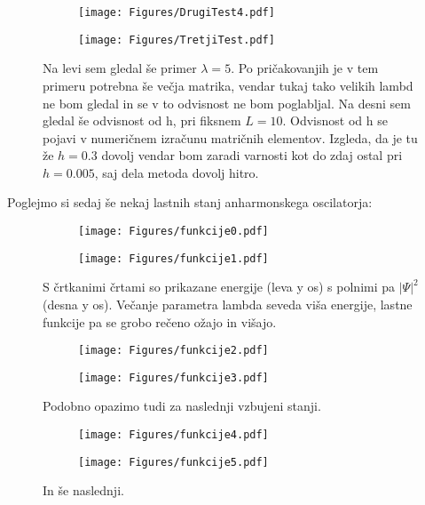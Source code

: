 \documentclass{article}
\begin{document}
\begin{figure}[H]
\centering
\begin{subfigure}{.49\textwidth}
\texttt{[image: Figures/DrugiTest4.pdf]}
\end{subfigure}
\begin{subfigure}{.49\textwidth}
\texttt{[image: Figures/TretjiTest.pdf]}
\end{subfigure}
\caption*{Na levi sem gledal še primer $\lambda = 5$. Po pričakovanjih je v tem primeru potrebna še večja matrika, vendar tukaj tako velikih lambd ne bom gledal in se v to odvisnost ne bom poglabljal. Na desni sem gledal še odvisnost od h, pri fiksnem $L=10$. Odvisnost od h se pojavi v numeričnem izračunu matričnih elementov. Izgleda, da je tu že $h=0.3$ dovolj vendar bom zaradi varnosti kot do zdaj ostal pri $h=0.005$, saj dela metoda dovolj hitro.}
\end{figure}

Poglejmo si sedaj še nekaj lastnih stanj anharmonskega oscilatorja:
\begin{figure}[H]
\centering
\begin{subfigure}{.49\textwidth}
\texttt{[image: Figures/funkcije0.pdf]}
\end{subfigure}
\begin{subfigure}{.49\textwidth}
\texttt{[image: Figures/funkcije1.pdf]}
\end{subfigure}
\caption*{S črtkanimi črtami so prikazane energije (leva y os) s polnimi pa $|\Psi|^2$ (desna y os). Večanje parametra lambda seveda viša energije, lastne funkcije pa se grobo rečeno ožajo in višajo.}
\end{figure}

\begin{figure}[H]
\centering
\begin{subfigure}{.49\textwidth}
\texttt{[image: Figures/funkcije2.pdf]}
\end{subfigure}
\begin{subfigure}{.49\textwidth}
\texttt{[image: Figures/funkcije3.pdf]}
\end{subfigure}
\caption*{Podobno opazimo tudi za naslednji vzbujeni stanji.}
\end{figure}

\begin{figure}[H]
\centering
\begin{subfigure}{.49\textwidth}
\texttt{[image: Figures/funkcije4.pdf]}
\end{subfigure}
\begin{subfigure}{.49\textwidth}
\texttt{[image: Figures/funkcije5.pdf]}
\end{subfigure}
\caption*{In še naslednji.}
\end{figure}
\end{document}
